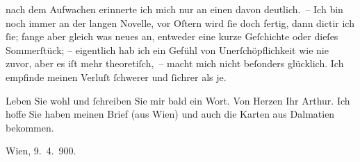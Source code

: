                nach dem Aufwachen erinnerte ich mich nur an einen davon deutlich. – Ich bin noch
               immer an der langen Novelle,
               vor Oſtern wird ſie doch fertig, dann dictir ich ſie; fange aber gleich
               was neues an, entweder eine kurze Geſchichte oder dieſes Sommerſtück; – eigentlich hab ich ein Gefühl von
                  Unerſchöpf{\pb}lichkeit wie nie zuvor, aber es iſt mehr
               theoretiſch, – macht mich nicht beſonders glücklich. Ich empfinde meinen Verluſt
               ſchwerer und ſichrer als je.\pend
           
\pstart
           Leben Sie wohl und ſchreiben Sie mir bald ein Wort.\pend
           \pstart Von Herzen Ihr \spacefill\mbox{Arthur.}\pend{}
\pstart
           \noindent{}Ich hoffe Sie haben meinen Brief \introOben{}(aus Wien)\introOben{} und auch die Karten aus Dalmatien bekommen.\pend
           
\pstart
           Wien, 9. 4. 900.\pend
           \endnumbering{}  
      